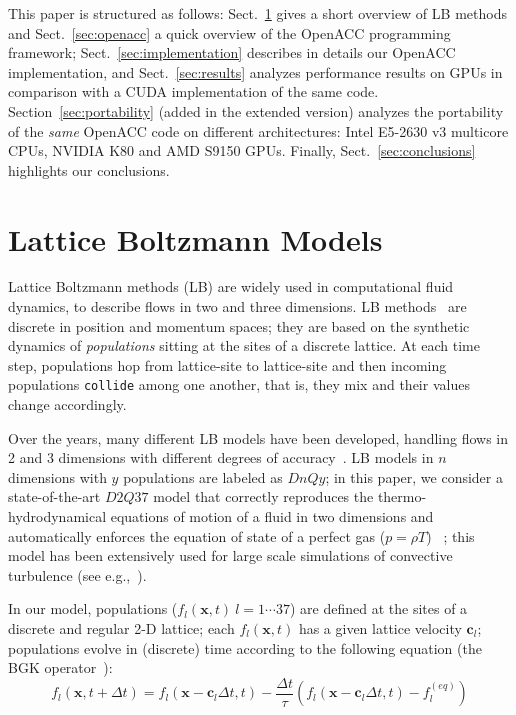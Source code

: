 \documentclass[times]{cpeauth}
\newcommand{\dt}{{\Delta t}}
\begin{document}
This paper is structured as follows: Sect.~\ref{sec:lbm} gives a short 
overview of LB methods and Sect.~\ref{sec:openacc} a quick overview of the
OpenACC programming framework;
% 
Sect.~\ref{sec:implementation} describes in details our OpenACC implementation, 
and Sect.~\ref{sec:results} analyzes performance results on GPUs in comparison with a
CUDA implementation of the same code.
% 
Section~\ref{sec:portability} (added in the extended version) analyzes 
the portability of the {\em same} OpenACC code on different architectures:
Intel E5-2630 v3 multicore CPUs, NVIDIA K80 and AMD S9150 GPUs. 
%
Finally, Sect.~\ref{sec:conclusions} highlights our conclusions.


\section{Lattice Boltzmann Models}\label{sec:lbm}

Lattice Boltzmann methods (LB) are widely used in computational fluid dynamics,
to describe flows in two and three dimensions. LB methods~\cite{sauro} are discrete 
in position and momentum spaces; they are based on the synthetic dynamics of {\em populations}
sitting at the sites of a discrete lattice. At each time step, populations hop
from lattice-site to lattice-site and then incoming populations {\tt collide}
among one another, that is, they mix and their values change accordingly. 
%

Over the years, many different LB models have been developed, handling 
flows in 2 and 3  dimensions with different degrees of accuracy~\cite{aidun}. 
%
LB models in $n$ dimensions with $y$ populations are labeled as $DnQy$;  
in this paper, we consider a state-of-the-art $D2Q37$ model that correctly reproduces the
thermo-hydrodynamical equations of motion of a fluid in two dimensions and
automatically enforces the equation of state of a perfect gas ($p = \rho T$)
~\cite{JFM,POF}; this model has been extensively used for large scale 
simulations of convective turbulence (see e.g.,~\cite{noi1,noi2,ripesi14}).
 
In our model, populations 
($f_l({\bm x},t)~l = 1 \cdots 37$) are defined at the sites of a discrete and 
regular 2-D lattice; each $f_l({\bm x},t)$ has a given lattice velocity $\bm c_{l}$;
populations evolve in (discrete) time according to the following equation
(the BGK operator~\cite{bgk}):
%
\begin{equation}
f_{l}({\bm x}, t+\dt) = f_{l}({\bm x} - {\bm c}_{l} \dt,t) 
-\frac{\dt}{\tau}\left(f_{l}({\bm x} - {\bm c}_{l} \dt,t) - f_l^{(eq)}\right)
\label{eq:master2}
\end{equation}
\end{document}
